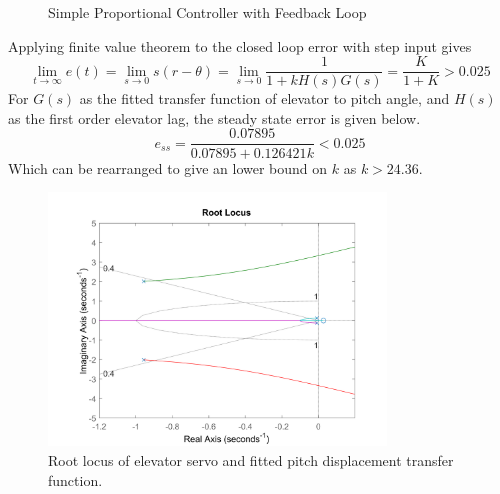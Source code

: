 \documentclass{article}
\begin{document}
\begin{figure}[H]
    \begin{center}
    \end{center}
    \caption{Simple Proportional Controller with Feedback Loop}\label{fig}
\end{figure}

Applying finite value theorem to the closed loop error with step input gives
\begin{equation}
    \lim_{t \to \infty} e(t) = \lim_{s \to 0} s (r - \theta) = \lim_{s \to 0} \frac{1}{1+kH(s)G(s)} = \frac{K}{1+K} > 0.025
\end{equation}
For $G(s)$ as the fitted transfer function of elevator to pitch angle, and $H(s)$ as the first order elevator lag, the steady state error is given below.
\begin{equation}
    e_{ss} = \frac{0.07895}{0.07895 + 0.126421 k} < 0.025
\end{equation}
Which can be rearranged to give an lower bound on $k$ as $k > 24.36$.

\begin{figure}[H]
    \centering
    \includegraphics[width=0.8\textwidth]{figures/pitch_autopilot_locus_bad.png}
    \caption{Root locus of elevator servo and fitted pitch displacement transfer function.}
    \label{fig:fitted_pitchrate_rlocus}
\end{figure}
\end{document}
